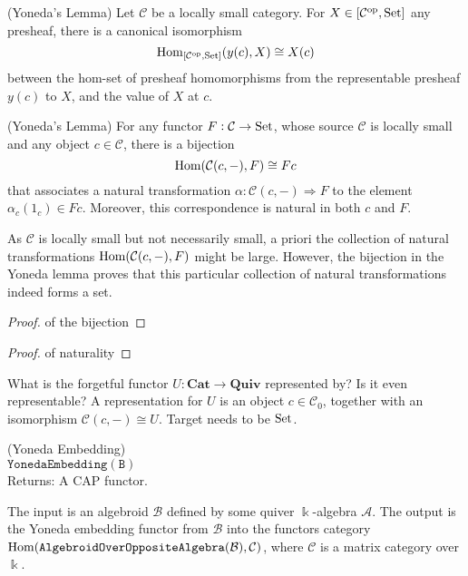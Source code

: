 \begin{lemma}{(Yoneda's Lemma)}
Let $\mathcal{C}$ be a locally small category. For $X \in [\mathcal{C}^{\text{op}}, \textup{Set}]$ any presheaf, there is a canonical isomorphism
\[
\textup{Hom}_{[\mathcal{C}^{\text{op}}, \textup{Set}]}(y(c), X) \cong X(c)
\]
between the hom-set of presheaf homomorphisms from the representable presheaf $y(c)$ to $X$, and the value of $X$ at $c$.
\end{lemma}

\begin{lemma}{(Yoneda's Lemma)}
For any functor $F : \mathcal{C} \rightarrow \textup{Set}$, whose source $\mathcal{C}$ is locally small and any
object $c \in \mathcal{C}$, there is a bijection
\[
\textup{Hom}(\mathcal{C}(c,-), F) \cong Fc
\]
that associates a natural transformation $\alpha : \mathcal{C}(c,-) \Rightarrow F$ to the element $\alpha_{c}(1_{c}) \in Fc$.
Moreover, this correspondence is natural in both $c$ and $F$.
\end{lemma}
As $\mathcal{C}$ is locally small but not necessarily small, a priori the collection of natural transformations
$\textup{Hom}(\mathcal{C}(c,-),F)$ might be large. However, the bijection in the Yoneda lemma proves that this particular
collection of natural transformations indeed forms a set.
\begin{proof}{of the bijection}

\end{proof}
\begin{proof}{of naturality}

\end{proof}

What is the forgetful functor $U : \mathbf{Cat} \rightarrow \mathbf{Quiv}$ represented by? Is it even representable?
A representation for $U$ is an object $c \in \mathcal{C}_{0}$, together with an isomorphism $\mathcal{C}(c,-) \cong U$.
Target needs to be $\textup{Set}$.


\begin{definition}{(Yoneda Embedding)}\label{def_func:yoneda_embedding}\\
$\mathtt{YonedaEmbedding(B)}$\\
Returns: A \textsc{CAP} functor.

\noindent The input is an algebroid $\mathcal{B}$ defined by some quiver $\Bbbk$-algebra $\mathcal{A}$. The output is the Yoneda embedding functor
from $\mathcal{B}$ into the functors category $\textup{Hom}( \mathtt{AlgebroidOverOppositeAlgebra}(\mathcal{B}), \mathcal{C} )$, where
$\mathcal{C}$ is a matrix category over $\Bbbk$.
\end{definition}

